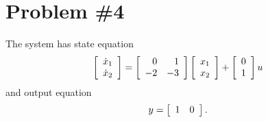 \documentclass{article}
\begin{document}
\section*{Problem \#4}
The system has state equation
$$
\left[\begin{array}{c}
\dot{x}_1 \\ \dot{x}_2
\end{array}\right] 
=
  \left[\begin{array}{r r}
    0 &  1 \\
   -2 & -3
  \end{array}\right]
  \left[\begin{array}{c}
    x_1 \\ x_2
  \end{array}\right]
+
  \left[\begin{array}{c}
    0 \\ 1
  \end{array}\right]
  u
$$
and output equation
$$
y = 
\left[\begin{array}{c c}
  1 & 0
\end{array}\right].
$$
\end{document}
